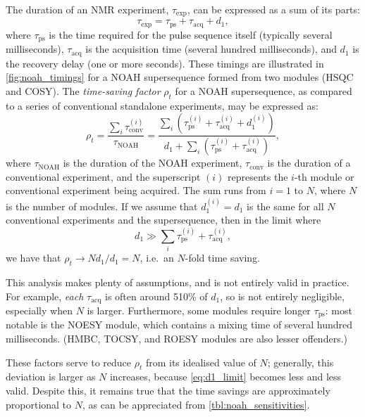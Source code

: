 The duration of an NMR experiment, $\tau_\text{exp}$, can be expressed as a sum of its parts:
\begin{equation}
    \label{eq:exp_duration_2d}
    \tau_\text{exp} = \tau_\text{ps} + \tau_\text{acq} + d_1,
\end{equation}
where $\tau_\text{ps}$ is the time required for the pulse sequence itself (typically several milliseconds), $\tau_\text{acq}$ is the acquisition time (several hundred milliseconds), and $d_1$ is the recovery delay (one or more seconds).
These timings are illustrated in \cref{fig:noah_timings} for a NOAH supersequence formed from two modules (HSQC and COSY).
The \textit{time-saving factor} $\rho_t$ for a NOAH supersequence, as compared to a series of conventional standalone experiments, may be expressed as:
\begin{equation}
    \label{eq:rho_t}
    \rho_t
    = \frac{\sum_i \tau_\text{conv}^{(i)}}{\tau_\text{NOAH}}
    = \frac{{\sum_i (\tau_\text{ps}^{(i)} + \tau_\text{acq}^{(i)} + d_1^{(i)})}}{d_1 + \sum_i (\tau_\text{ps}^{(i)} + \tau_\text{acq}^{(i)})},
\end{equation}
where $\tau_\text{NOAH}$ is the duration of the NOAH experiment, $\tau_\text{conv}$ is the duration of a conventional experiment, and the superscript $(i)$ represents the $i$-th module or conventional experiment being acquired.
The sum runs from $i = 1$ to $N$, where $N$ is the number of modules.
If we assume that $d_1^{(i)} = d_1$ is the same for all $N$ conventional experiments and the supersequence, then in the limit where
\begin{equation}
    \label{eq:d1_limit}
    d_1 \gg \sum_i \tau_\text{ps}^{(i)} + \tau_\text{acq}^{(i)},
\end{equation}
we have that $\rho_t \to Nd_1/d_1 = N$, i.e.\ an $N$-fold time saving.

This analysis makes plenty of assumptions, and is not entirely valid in practice.
For example, \textit{each} $\tau_\text{acq}$ is often around 5\text{--}10\% of $d_1$, so is not entirely negligible, especially when $N$ is larger.
Furthermore, some modules require longer $\tau_\text{ps}$: most notable is the NOESY module, which contains a mixing time of several hundred milliseconds. (HMBC, TOCSY, and ROESY modules are also lesser offenders.)

These factors serve to reduce $\rho_t$ from its idealised value of $N$; generally, this deviation is larger as $N$ increases, because \cref{eq:d1_limit} becomes less and less valid.
Despite this, it remains true that the time savings are approximately proportional to $N$, as can be appreciated from \cref{tbl:noah_sensitivities}.


